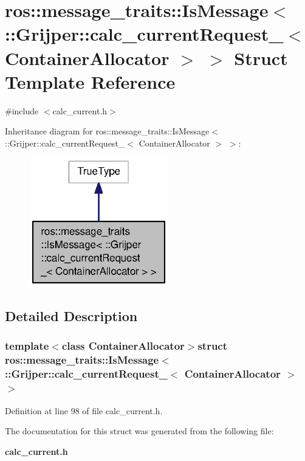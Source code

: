 \section{ros\-:\-:message\-\_\-traits\-:\-:Is\-Message$<$ \-:\-:Grijper\-:\-:calc\-\_\-current\-Request\-\_\-$<$ Container\-Allocator $>$ $>$ Struct Template Reference}
\label{structros_1_1message__traits_1_1IsMessage_3_01_1_1Grijper_1_1calc__currentRequest___3_01ContainerAllocator_01_4_01_4}


{\ttfamily \#include $<$calc\-\_\-current.\-h$>$}



Inheritance diagram for ros\-:\-:message\-\_\-traits\-:\-:Is\-Message$<$ \-:\-:Grijper\-:\-:calc\-\_\-current\-Request\-\_\-$<$ Container\-Allocator $>$ $>$\-:\nopagebreak
\begin{figure}[H]
\begin{center}
\leavevmode
\includegraphics[width=172pt]{structros_1_1message__traits_1_1IsMessage_3_01_1_1Grijper_1_1calc__currentRequest___3_01Containe199a18db502778135550d4231b01e78a}
\end{center}
\end{figure}


\subsection{Detailed Description}
\subsubsection*{template$<$class Container\-Allocator$>$struct ros\-::message\-\_\-traits\-::\-Is\-Message$<$ \-::\-Grijper\-::calc\-\_\-current\-Request\-\_\-$<$ Container\-Allocator $>$ $>$}



Definition at line 98 of file calc\-\_\-current.\-h.



The documentation for this struct was generated from the following file\-:\begin{DoxyCompactItemize}
\item 
{\bf calc\-\_\-current.\-h}\end{DoxyCompactItemize}
